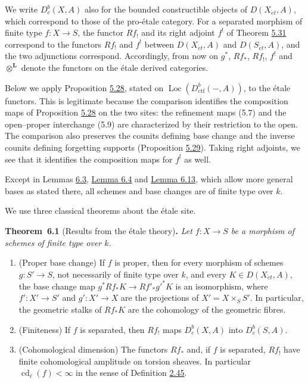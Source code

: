 \documentclass[11pt]{article}
\newenvironment{bpstatement}[2]{\par\addvspace{0.6\baselineskip}\noindent\textbf{#1}#2\textbf{.}\enspace\ignorespaces}
  {\par\addvspace{0.4\baselineskip}}
\newenvironment{bpstatementit}[2]{\begin{bpstatement}{#1}{#2}\itshape\ignorespaces}{\end{bpstatement}}
\providecommand{\Dbc}{}\renewcommand{\Dbc}{D^b_c}
\providecommand{\Loc}{}\renewcommand{\Loc}{\operatorname{Loc}}
\begin{document}
We write \(\Dbc(X,A)\) also for the bounded constructible objects of \(D(X_{\acute{e}t},A)\), which correspond to those of the pro-étale category. For a separated morphism of finite type \(f:X\to S\), the functor \(Rf_!\) and its right adjoint \(f^!\) of Theorem \hyperref[bp506]{5.31} correspond to the functors \(Rf_!\) and \(f^!\) between \(D(X_{\acute{e}t},A)\) and \(D(S_{\acute{e}t},A)\), and the two adjunctions correspond. Accordingly, from now on \(g^*\), \(Rf_*\), \(Rf_!\), \(f^!\) and \(\otimes^{\mathbf L}\) denote the functors on the étale derived categories.

Below we apply Proposition \hyperref[bp496]{5.28}, stated on \(\Loc(D^b_{\mathrm{ctf}}(-,A))\), to the étale functors. This is legitimate because the comparison identifies the composition maps of Proposition \hyperref[bp496]{5.28} on the two sites: the refinement maps (5.7) and the open–proper interchange (5.9) are characterized by their restriction to the open. The comparison also preserves the counits defining base change and the inverse counits defining forgetting supports (Proposition \hyperref[bp499]{5.29}). Taking right adjoints, we see that it identifies the composition maps for \(f^!\) as well.

Except in Lemmas \hyperref[bp523]{6.3}, \hyperref[bp526]{Lemma 6.4} and \hyperref[bp553]{Lemma 6.13}, which allow more general bases as stated there, all schemes and base changes are of finite type over \(k\).

We use three classical theorems about the étale site.

\label{bp517}%
\begin{bpstatementit}{Theorem~6.1}{ (Results from the étale theory)}
Let \(f:X\to S\) be a morphism of schemes of finite type over \(k\).

\begin{enumerate}
\item (Proper base change) If \(f\) is proper, then for every morphism of schemes \(g:S'\to S\), not necessarily of finite type over \(k\), and every \(K\in D(X_{\acute{e}t},A)\), the base change map \(g^*Rf_*K\to Rf'_*g'^*K\) is an isomorphism, where \(f':X'\to S'\) and \(g':X'\to X\) are the projections of \(X'=X\times_SS'\). In particular, the geometric stalks of \(Rf_*K\) are the cohomology of the geometric fibres.
\item (Finiteness) If \(f\) is separated, then \(Rf_!\) maps \(\Dbc(X,A)\) into \(\Dbc(S,A)\).
\item (Cohomological dimension) The functors \(Rf_*\) and, if \(f\) is separated, \(Rf_!\) have finite cohomological amplitude on torsion sheaves. In particular \(\operatorname{cd}_\ell(f)<\infty\) in the sense of Definition \hyperref[bp137]{2.45}.
\end{enumerate}
\end{bpstatementit}
\end{document}
